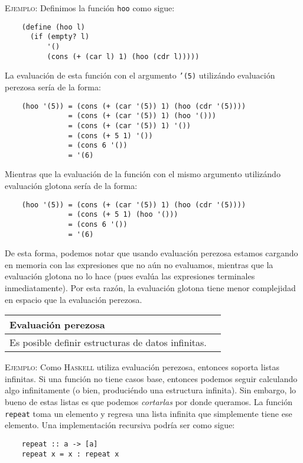 \documentclass[letterpaper,11pt]{article}
\begin{document}
\textsc{Ejemplo:} Definimos la función \texttt{hoo} como sigue: 
\begin{verbatim}
    (define (hoo l)
      (if (empty? l)
          '()
          (cons (+ (car l) 1) (hoo (cdr l)))))
\end{verbatim}

\newpage
La evaluación de esta función con el argumento \texttt{'(5)} utilizándo 
evaluación perezosa sería de la forma:
\begin{verbatim}
    (hoo '(5)) = (cons (+ (car '(5)) 1) (hoo (cdr '(5))))
               = (cons (+ (car '(5)) 1) (hoo '()))
               = (cons (+ (car '(5)) 1) '())
               = (cons (+ 5 1) '())
               = (cons 6 '())
               = '(6)
\end{verbatim}

Mientras que la evaluación de la función con el mismo argumento utilizándo 
evaluación glotona sería de la forma:
\begin{verbatim}
    (hoo '(5)) = (cons (+ (car '(5)) 1) (hoo (cdr '(5))))
               = (cons (+ 5 1) (hoo '()))
               = (cons 6 '())
               = '(6)
\end{verbatim}

De esta forma, podemos notar que usando evaluación perezosa estamos cargando 
en memoria con las expresiones que no aún no evaluamos, mientras que la 
evaluación glotona no lo hace (pues evalúa las expresiones terminales 
inmediatamente). Por esta razón, la evaluación glotona tiene menor complejidad 
en espacio que la evaluación perezosa.

\begin{table}[h]
    \centering  
    \begin{tabular}{|L|L|}
        \hline
        Evaluación perezosa \\
        \hline 
        Es posible definir estructuras de datos infinitas. \\
        \hline
    \end{tabular}
\end{table}

\textsc{Ejemplo:} Como \textsc{Haskell} utiliza evaluación perezosa, entonces 
soporta listas infinitas. Si una función no tiene casos base, entonces podemos 
seguir calculando algo infinitamente (o bien, produciéndo una estructura 
infinita). Sin embargo, lo bueno de estas listas es que podemos 
\textit{cortarlas} por donde queramos. La función \texttt{repeat} toma un 
elemento y regresa una lista infinita que simplemente tiene ese elemento. 
Una implementación recursiva podría ser como sigue:
\begin{verbatim}
    repeat :: a -> [a]
    repeat x = x : repeat x
\end{verbatim}
\end{document}
